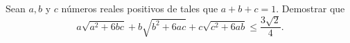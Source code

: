 Sean $a, b$ y $c$ números reales positivos de tales que $a+b+c=1$. Demostrar que
\[ a\sqrt{a^2+6bc}+b\sqrt{b^2+6ac}+c\sqrt{c^2+6ab}\leq\frac{3\sqrt{2}}{4}.\]
